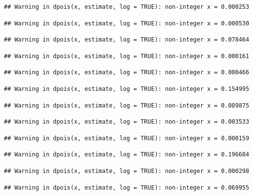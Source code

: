 \documentclass[]{article}
\begin{document}
\begin{verbatim}
## Warning in dpois(x, estimate, log = TRUE): non-integer x = 0.000253
\end{verbatim}

\begin{verbatim}
## Warning in dpois(x, estimate, log = TRUE): non-integer x = 0.000530
\end{verbatim}

\begin{verbatim}
## Warning in dpois(x, estimate, log = TRUE): non-integer x = 0.078464
\end{verbatim}

\begin{verbatim}
## Warning in dpois(x, estimate, log = TRUE): non-integer x = 0.000161
\end{verbatim}

\begin{verbatim}
## Warning in dpois(x, estimate, log = TRUE): non-integer x = 0.000466
\end{verbatim}

\begin{verbatim}
## Warning in dpois(x, estimate, log = TRUE): non-integer x = 0.154995
\end{verbatim}

\begin{verbatim}
## Warning in dpois(x, estimate, log = TRUE): non-integer x = 0.089875
\end{verbatim}

\begin{verbatim}
## Warning in dpois(x, estimate, log = TRUE): non-integer x = 0.003533
\end{verbatim}

\begin{verbatim}
## Warning in dpois(x, estimate, log = TRUE): non-integer x = 0.000159
\end{verbatim}

\begin{verbatim}
## Warning in dpois(x, estimate, log = TRUE): non-integer x = 0.196684
\end{verbatim}

\begin{verbatim}
## Warning in dpois(x, estimate, log = TRUE): non-integer x = 0.000298
\end{verbatim}

\begin{verbatim}
## Warning in dpois(x, estimate, log = TRUE): non-integer x = 0.069955
\end{verbatim}
\end{document}
